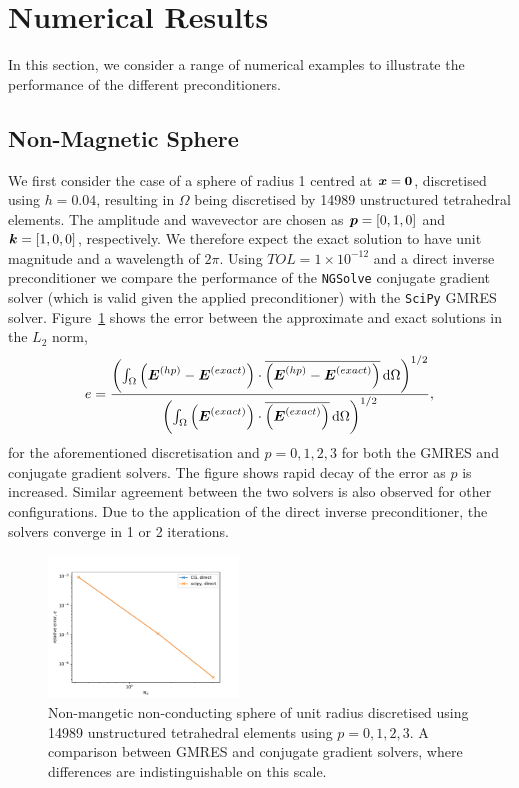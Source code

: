 \documentclass[a4paper,12]{elsarticle}
\theoremstyle{definition}
\renewcommand{\vec}[1]{\mbox{\boldmath$#1$}}
\begin{document}
\section{Numerical Results}
In this section, we consider a range of numerical examples to illustrate the performance of the different preconditioners.

\subsection{Non-Magnetic Sphere}

We first consider the case of a sphere of radius 1 centred at $\vec{x}=\vec{0}$, discretised using $h=0.04$, resulting in $\Omega$ being discretised by 14989 unstructured tetrahedral elements. The amplitude and wavevector are chosen as $\vec{p} = [0,1,0]$ and $\vec{k}=[1,0,0]$, respectively. We therefore expect the exact solution to have unit magnitude and a wavelength of $2\pi$. 
Using $TOL=1\times 10^{-12}$ and a direct inverse preconditioner we compare the performance of the \texttt{NGSolve} conjugate gradient solver (which is valid given the applied preconditioner) with the \texttt{SciPy} GMRES solver. Figure~\ref{fig:sphere_solver_comparison} shows the error between the approximate and exact solutions in the $L_2$ norm,
\begin{equation}
e = \frac{\left(\int_\Omega \left(\vec{E}^{(hp)} - \vec{E}^{(exact)}\right) \cdot \overline{\left(\vec{E}^{(hp)} - \vec{E}^{(exact)}\right)} \, \mathrm{d}\Omega\right)^{1/2}}{\left(\int_\Omega \left(\vec{E}^{(exact)}\right) \cdot \overline{\left(\vec{E}^{(exact)}\right)} \, \mathrm{d}\Omega\right)^{1/2}},
\end{equation}
for the aforementioned discretisation and $p=0,1,2,3$ for both the GMRES and conjugate gradient solvers. The figure shows rapid decay of the error as $p$ is increased. Similar agreement between the two solvers is also observed for other configurations. Due to the application of the direct inverse preconditioner, the solvers converge in 1 or 2 iterations.

\begin{figure}
\centering
\includegraphics[width=0.45\textwidth]{Sphere_convergence_scipy_ngsolve_comp.pdf}
\caption{Non-mangetic non-conducting sphere of unit radius discretised using 14989 unstructured tetrahedral elements using $p=0,1,2,3$. A comparison between GMRES and conjugate gradient solvers, where differences are indistinguishable on this scale.}
\label{fig:sphere_solver_comparison}
\end{figure}
\end{document}
